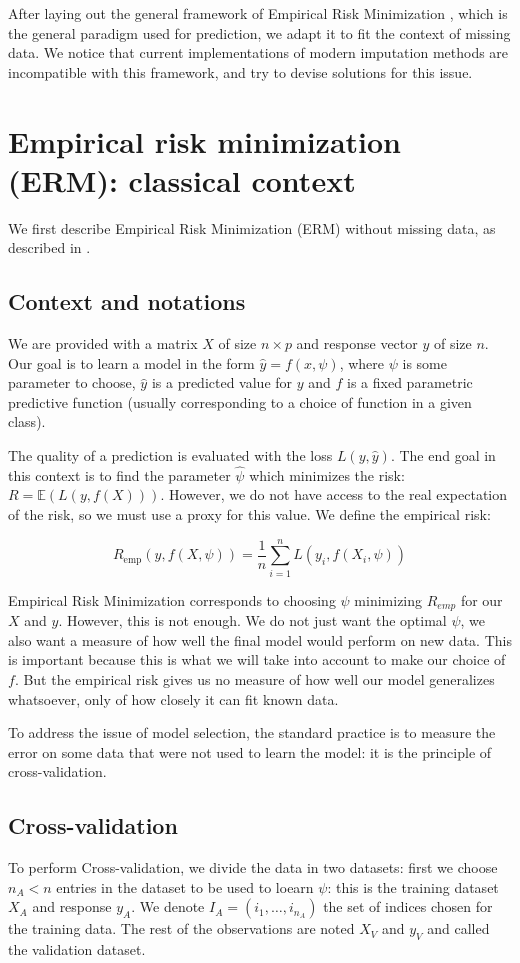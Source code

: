 \documentclass[12pt, a4paper]{memoir}
\begin{document}
After laying out the general framework of Empirical Risk Minimization \cite{ERM}, which is the general paradigm used for prediction, we adapt it to fit the context of missing data. We notice that current implementations of modern imputation methods are incompatible with this framework, and try to devise solutions for this issue.
	\section{Empirical risk minimization (ERM): classical context}
We first describe Empirical Risk Minimization (ERM) without missing data, as described in \cite{ERM}.
		\subsection{Context and notations}
We are provided with a matrix $X$ of size $n \times p$ and response vector $y$ of size $n$. Our goal is to learn a model in the form $\hat{y} = f(x, \psi)$, where $\psi$ is some parameter to choose, $\hat{y}$ is a predicted value for $y$ and $f$ is a fixed parametric predictive function (usually corresponding to a choice of function in a given class).

The quality of a prediction is evaluated with the loss $L(y,\hat{y})$. The end goal in this context is to find the parameter $\hat{\psi}$ which minimizes the risk: $R = \mathbb{E}(L(y, f(X)))$. However, we do not have access to the real expectation of the risk, so we must use a proxy for this value. We define the empirical risk:

$$ R_{\text{emp}}(y, f(X, \psi)) = \frac{1}{n} \sum\limits_{i=1}^n L(y_i, f(X_i, \psi))$$

Empirical Risk Minimization corresponds to choosing $\psi$ minimizing $R_{emp}$ for our $X$ and $y$. However, this is not enough. We do not just want the optimal $\psi$, we also want a measure of how well the final model would perform on new data. This is important because this is what we will take into account to make our choice of $f$. But the empirical risk gives us no measure of how well our model generalizes whatsoever, only of how closely it can fit known data.

To address the issue of model selection, the standard practice is to measure the error on some data that were not used to learn the model: it is the principle of cross-validation.

		\subsection{Cross-validation}
To perform Cross-validation, we divide the data in two datasets: first we choose $n_A < n$ entries in the dataset to be used to loearn $\psi$: this is the training dataset $X_A$ and response $y_A$. We denote $I_A = (i_1, \ldots, i_{n_A})$ the set of indices chosen for the training data. The rest of the observations are noted $X_V$ and $y_V$ and called the validation dataset.
\end{document}
